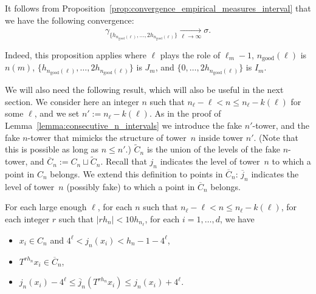 \documentclass[AHL,Unicode,longabstracts]{cedram}
\newcommand{\egdef}{:=}
\newcommand{\tend}[3][]{\xrightarrow[#2\to#3]{#1}}
\newcommand{\ngood}{n_{\text{good}}}
\begin{document}
\begin{rema}\label{rem:6.2}
It follows from Proposition~\ref{prop:convergence_empirical_measures_interval} that we have the following convergence:
\[
\gamma_{\{h_{\ngood(\ell)},\ldots,2h_{\ngood(\ell)}\}} \tend{\ell}{\infty} \sigma.
\]
\end{rema}

Indeed, this proposition applies where $\ell$ plays the role of $\ell_m-1$, $\ngood(\ell)$ is $n(m)$, $\{h_{\ngood(\ell)},\ldots,2h_{\ngood(\ell)}\}$ is $J_m$, and $\{0,\ldots,2h_{\ngood(\ell)}\}$ is $I_m$.


We will also need the following result, which will also be useful in the next section. We consider here an integer $n$ such that $n_\ell-\ell< n \le n_\ell-k(\ell)$ for some $\ell$, and we set $n'\egdef n_\ell-k(\ell)$. As in the proof of Lemma~\ref{lemma:consecutive_n_intervals} we introduce the fake $n'$-tower, and the fake $n$-tower that mimicks the structure of tower~$n$ inside tower $n'$. (Note that this is possible as long as $n\le n'$.) $\tilde C_n$ is the union of the levels of the fake $n$-tower, and $\overline{C}_n\egdef C_n\sqcup\tilde C_n$. Recall that $j_n$ indicates the level of tower~$n$ to which a point in $C_n$ belongs. We extend this definition to points in $\overline{C}_n$: $\overline{j}_n$ indicates the level of tower~$n$ (possibly fake) to which a point in $\overline{C}_n$ belongs.

\begin{lemm}\label{lemma:shifting}
For each large enough $\ell$, for each $n$ such that $n_\ell-\ell< n \le n_\ell-k(\ell)$, for each integer $r$ such that $|rh_n|<10 h_{n_\ell}$, for each $i=1,\ldots,d$, we have
\begin{itemize}
\item $x_i\in C_n$ and $4^\ell<j_n(x_i)<h_n-1-4^\ell$,
\item $T^{rh_n}x_i\in \overline{C}_n$,
\item $j_n(x_i)-4^\ell\le\overline{j}_n \left(T^{rh_n} x_i\right)\le j_n(x_i)+4^\ell$.
\end{itemize}
\end{lemm}
\end{document}
